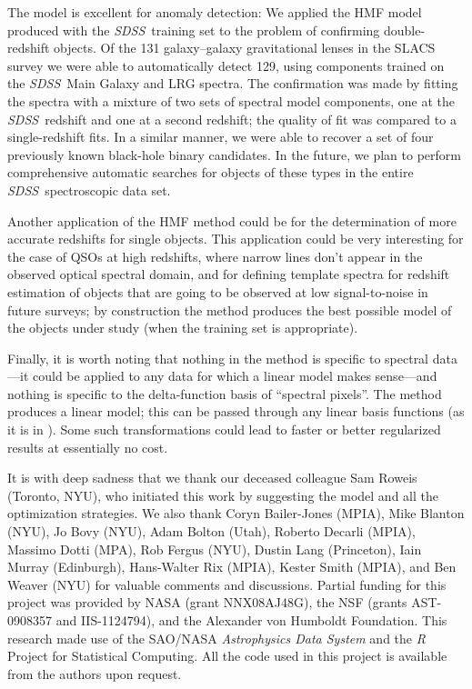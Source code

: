 \documentclass[12pt,preprint]{aastex}
\newcommand{\project}[1]{\textsl{#1}}
\newcommand{\sdss}{\project{SDSS}}
\newcommand{\SDSS}{\sdss}
\begin{document}
The model is excellent for anomaly detection:  We applied the HMF
model produced with the \SDSS\ training set to the problem of
confirming double-redshift objects.  Of the 131 galaxy--galaxy
gravitational lenses in the SLACS survey we were able to automatically
detect 129, using components trained on the \SDSS\ Main Galaxy and LRG
spectra. The confirmation was made by fitting the spectra with a
mixture of two sets of spectral model components, one at the
\SDSS\ redshift and one at a second redshift; the quality of fit was
compared to a single-redshift fits.  In a similar manner, we were able
to recover a set of four previously known black-hole binary
candidates.  In the future, we plan to perform comprehensive automatic
searches for objects of these types in the entire \SDSS\ spectroscopic
data set.

Another application of the HMF method could be for the determination
of more accurate redshifts for single objects.  This application could
be very interesting for the case of QSOs at high redshifts, where
narrow lines don't appear in the observed optical spectral domain, and for
defining template spectra for redshift estimation of objects that are
going to be observed at low signal-to-noise in future surveys; by
construction the method produces the best possible model of the
objects under study (when the training set is appropriate).

Finally, it is worth noting that nothing in the method is specific to
spectral data---it could be applied to any data for which a linear
model makes sense---and nothing is specific to the delta-function
basis of ``spectral pixels''.  The method produces a linear model;
this can be passed through any linear basis functions (as it is
in \citealt{blanton}).  Some such
transformations could lead to faster or better regularized results at
essentially no cost.

\acknowledgments It is with deep sadness that we thank our deceased
colleague Sam Roweis (Toronto, NYU), who initiated this work by
suggesting the model and all the optimization strategies.  We also
thank 
 Coryn Bailer-Jones (MPIA),
 Mike Blanton (NYU),
 Jo Bovy (NYU),
 Adam Bolton (Utah),
 Roberto Decarli (MPIA),
 Massimo Dotti (MPA),
 Rob Fergus (NYU),
 Dustin Lang (Princeton),
 Iain Murray (Edinburgh),
 Hans-Walter Rix (MPIA),
 Kester Smith (MPIA), and
 Ben Weaver (NYU) for valuable
comments and discussions.  Partial funding for this project was
provided by NASA (grant NNX08AJ48G), the NSF (grants AST-0908357 and IIS-1124794), and
the Alexander von Humboldt Foundation.  This research made use of the
SAO/NASA \project{Astrophysics Data System} and the \project{R}
Project for Statistical Computing.  All the code used in this project
is available from the authors upon request.
\end{document}
